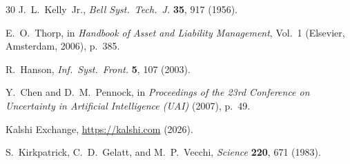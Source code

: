 \documentclass[aps, reprint, prl, twocolumn, superscriptaddress,amsmath,amssymb,noeprint]{revtex4-2}
\begin{document}
\begin{thebibliography}{30}
J.~L.~Kelly~Jr., \emph{Bell Syst.\ Tech.\ J.} \textbf{35}, 917 (1956).

E.~O.~Thorp, in \emph{Handbook of Asset and Liability Management},
Vol.~1 (Elsevier, Amsterdam, 2006), p.~385.

R.~Hanson, \emph{Inf.\ Syst.\ Front.} \textbf{5}, 107 (2003).

Y.~Chen and D.~M.~Pennock, in \emph{Proceedings of the 23rd Conference on
Uncertainty in Artificial Intelligence (UAI)} (2007), p.~49.

Kalshi Exchange, \url{https://kalshi.com} (2026).


S.~Kirkpatrick, C.~D.~Gelatt, and M.~P.~Vecchi, \emph{Science} \textbf{220},
671 (1983).

\end{thebibliography}
\end{document}
